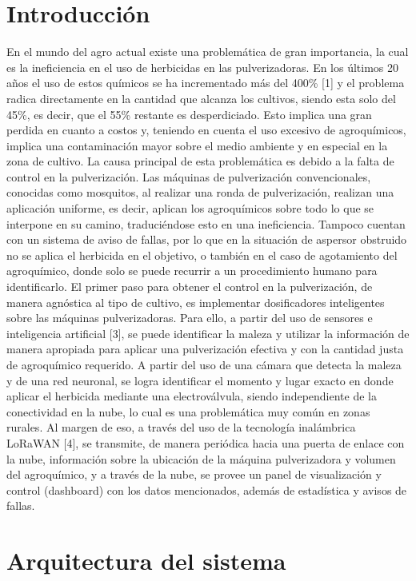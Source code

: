 \documentclass[conference]{IEEEtran}
\begin{document}
\section{Introducción}
En el mundo del agro actual existe una problemática de gran importancia, la cual es la ineficiencia en el uso de herbicidas en las pulverizadoras. 
En los últimos 20 años el uso de estos químicos se ha incrementado más del 400{\%} [1] y el problema radica directamente en la cantidad que alcanza los cultivos, siendo esta solo del 45{\%}, es decir, que el 55\% restante es desperdiciado.
Esto implica una gran perdida en cuanto a costos y, teniendo en cuenta el uso excesivo de agroquímicos, implica una contaminación mayor sobre el medio ambiente y en especial en la zona de cultivo.
La causa principal de esta problemática es debido a la falta de control en la pulverización. Las máquinas de pulverización convencionales, conocidas como mosquitos, al realizar una ronda de pulverización, realizan una aplicación uniforme, es decir, aplican los agroquímicos sobre todo lo que se interpone en su camino, traduciéndose esto en una ineficiencia. 
Tampoco cuentan con un sistema de aviso de fallas, por lo que en la situación de aspersor obstruido no se aplica el herbicida en el objetivo, o también en el caso de agotamiento del agroquímico, donde solo se puede recurrir a un procedimiento humano para identificarlo.
El primer paso para obtener el control en la pulverización, de manera agnóstica al tipo de cultivo, es implementar dosificadores inteligentes sobre las máquinas pulverizadoras. 
Para ello, a partir del uso de sensores e inteligencia artificial [3], se puede identificar la maleza y utilizar la información de manera apropiada para aplicar una pulverización efectiva y con la cantidad justa de agroquímico requerido. A partir del uso de una cámara que detecta la maleza y de una red neuronal, se logra identificar el momento y lugar exacto en donde aplicar el herbicida mediante una electroválvula, siendo independiente de la conectividad en la nube, lo cual es una problemática muy común en zonas rurales. Al margen de eso, a través del uso de la tecnología inalámbrica LoRaWAN [4], se transmite, de manera periódica hacia una puerta de enlace con la nube, información sobre la ubicación de la máquina pulverizadora y volumen del agroquímico, y a través de la nube, se provee un panel de visualización y control (dashboard) con los datos mencionados, además de estadística y avisos de fallas.


\section{Arquitectura del sistema}
\end{document}
